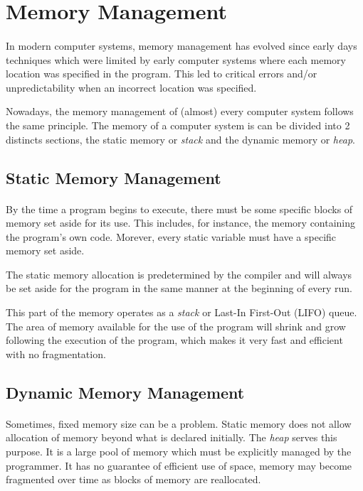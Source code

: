 \section{Memory Management}
\paragraph{}
In modern computer systems, memory management has evolved since early days techniques which were limited
    by early computer systems where each memory location was specified in the program.
This led to critical errors and/or unpredictability when an incorrect location was specified.

Nowadays, the memory management of (almost) every computer system follows the same principle.
The memory of a computer system is can be divided into 2 distincts sections,
    the static memory or \textit{stack} and the dynamic memory or \textit{heap}.

\subsection{Static Memory Management}
\paragraph{}
By the time a program begins to execute, there must be some specific blocks of memory set aside for its use.
This includes, for instance, the memory containing the program's own code.
Morever, every static variable must have a specific memory set aside.

The static memory allocation is predetermined by the compiler
    and will always be set aside for the program in the same manner at the beginning of every run.

This part of the memory operates as a \textit{stack} or Last-In First-Out (LIFO) queue.
The area of memory available for the use of the program will shrink and grow following the execution of the program,
which makes it very fast and efficient with no fragmentation.

\subsection{Dynamic Memory Management}
\paragraph{}
Sometimes, fixed memory size can be a problem.
Static memory does not allow allocation of memory beyond what is declared initially.
The \textit{heap} serves this purpose.
It is a large pool of memory which must be explicitly managed by the programmer.
It has no guarantee of efficient use of space, memory may become fragmented over time as blocks of memory are reallocated.

